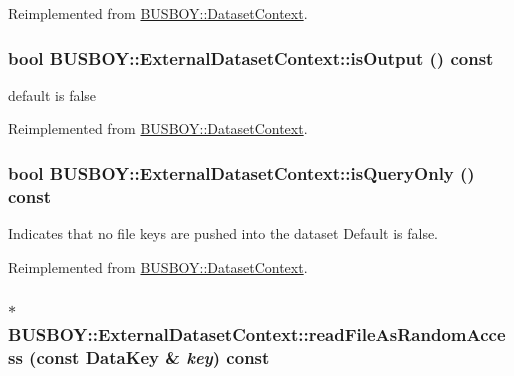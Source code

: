 Reimplemented from \hyperlink{classBUSBOY_1_1DatasetContext_ae85935dfaf6cb24e10e69f3d466c6699}{BUSBOY::DatasetContext}.\hypertarget{classBUSBOY_1_1ExternalDatasetContext_a6fef256e1e09e3bbed17daec4fbbed7b}{
\subsubsection[{isOutput}]{\setlength{\rightskip}{0pt plus 5cm}bool BUSBOY::ExternalDatasetContext::isOutput () const}}
\label{classBUSBOY_1_1ExternalDatasetContext_a6fef256e1e09e3bbed17daec4fbbed7b}


default is false 

Reimplemented from \hyperlink{classBUSBOY_1_1DatasetContext_a25d929ed419ebb4c006d4926f53f504e}{BUSBOY::DatasetContext}.\hypertarget{classBUSBOY_1_1ExternalDatasetContext_a85d83f0dffb7e0fbd8899de1abd28e85}{
\subsubsection[{isQueryOnly}]{\setlength{\rightskip}{0pt plus 5cm}bool BUSBOY::ExternalDatasetContext::isQueryOnly () const}}
\label{classBUSBOY_1_1ExternalDatasetContext_a85d83f0dffb7e0fbd8899de1abd28e85}


Indicates that no file keys are pushed into the dataset Default is false. 

Reimplemented from \hyperlink{classBUSBOY_1_1DatasetContext_a934ce529a4ae4cced154260714bbd380}{BUSBOY::DatasetContext}.\hypertarget{classBUSBOY_1_1ExternalDatasetContext_a6379574013a2236a9efba6a823a7a741}{
\subsubsection[{readFileAsRandomAccess}]{ $\ast$ BUSBOY::ExternalDatasetContext::readFileAsRandomAccess (const {\bf DataKey} \& {\em key}) const}}
\label{classBUSBOY_1_1ExternalDatasetContext_a6379574013a2236a9efba6a823a7a741}


